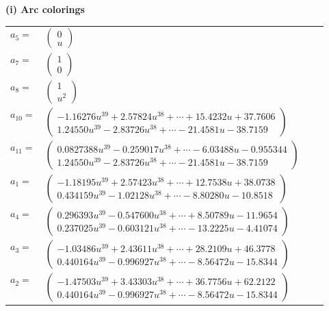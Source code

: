 \documentclass[1p]{elsarticle_modified}
\theoremstyle{definition}
\begin{document}
\flushleft \textbf{(i) Arc colorings}\\
\begin{tabular}{m{7pt} m{180pt} m{7pt} m{180pt} }
\flushright $a_{5}=$&$\begin{pmatrix}0\\u\end{pmatrix}$ \\
\flushright $a_{7}=$&$\begin{pmatrix}1\\0\end{pmatrix}$ \\
\flushright $a_{8}=$&$\begin{pmatrix}1\\u^2\end{pmatrix}$ \\
\flushright $a_{10}=$&$\begin{pmatrix}-1.16276 u^{39}+2.57824 u^{38}+\cdots+15.4232 u+37.7606\\1.24550 u^{39}-2.83726 u^{38}+\cdots-21.4581 u-38.7159\end{pmatrix}$ \\
\flushright $a_{11}=$&$\begin{pmatrix}0.0827388 u^{39}-0.259017 u^{38}+\cdots-6.03488 u-0.955344\\1.24550 u^{39}-2.83726 u^{38}+\cdots-21.4581 u-38.7159\end{pmatrix}$ \\
\flushright $a_{1}=$&$\begin{pmatrix}-1.18195 u^{39}+2.57423 u^{38}+\cdots+12.7538 u+38.0738\\0.434159 u^{39}-1.02128 u^{38}+\cdots-8.80280 u-10.8518\end{pmatrix}$ \\
\flushright $a_{4}=$&$\begin{pmatrix}0.296393 u^{39}-0.547600 u^{38}+\cdots+8.50789 u-11.9654\\0.237025 u^{39}-0.603121 u^{38}+\cdots-13.2225 u-4.41074\end{pmatrix}$ \\
\flushright $a_{3}=$&$\begin{pmatrix}-1.03486 u^{39}+2.43611 u^{38}+\cdots+28.2109 u+46.3778\\0.440164 u^{39}-0.996927 u^{38}+\cdots-8.56472 u-15.8344\end{pmatrix}$ \\
\flushright $a_{2}=$&$\begin{pmatrix}-1.47503 u^{39}+3.43303 u^{38}+\cdots+36.7756 u+62.2122\\0.440164 u^{39}-0.996927 u^{38}+\cdots-8.56472 u-15.8344\end{pmatrix}$ \\

\end{tabular}
\end{document}
